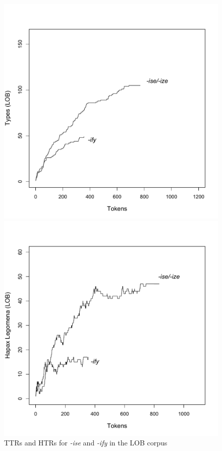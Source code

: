 \begin{figure}
\caption{TTRs and HTRs for \textit{-ise} and \textit{-ify} in the LOB corpus}
\label{fig:izettrhtr}
\begin{minipage}{.5\textwidth}
  \centering
  \includegraphics[width=\textwidth]{figures/lobiseifytypes}
\end{minipage}%
\begin{minipage}{.5\textwidth}
  \centering
  \includegraphics[width=\textwidth]{figures/lobiseifyhapaxes}
\end{minipage}
\end{figure}

